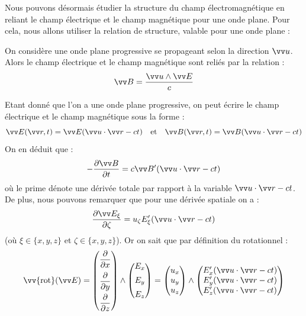 \documentclass[11pt,fleqn]{book} %
\newcommand{\rot}{\vv{\mathrm{rot}}}
\begin{document}
Nous pouvons désormais étudier la structure du champ électromagnétique en reliant le champ électrique et le champ magnétique pour une onde plane. Pour cela, nous allons utiliser la relation de structure, valable pour une onde plane :
\begin{theorem}
	On considère une onde plane progressive se propageant selon la direction $\vv u$. Alors le champ électrique et le champ magnétique sont reliés par la relation :
	\begin{equation}
		\vv B = \frac{\vv u \wedge \vv E}{c}
	\end{equation}
\end{theorem}
\begin{demonstration}
	Etant donné que l'on a une onde plane progressive, on peut écrire le champ électrique et le champ magnétique sous la forme :
	\begin{equation}
		\vv E(\vv r,t) = \vv E(\vv u \cdot \vv r - c t) \quad \mathrm{et} \quad \vv B(\vv r,t) = \vv B(\vv u \cdot \vv r - c t)
	\end{equation}
	On en déduit que :
	\begin{equation}
		- \frac{\partial \vv B}{\partial t} = c \vv B'(\vv u \cdot \vv r - c t)
	\end{equation}
	où le prime dénote une dérivée totale par rapport à la variable $\vv u \cdot \vv r - c t$. De plus, nous pouvons remarquer que pour une dérivée spatiale on a :
	\begin{equation}
		\frac{\partial \vv E_\xi}{\partial \zeta} = u_\zeta E_\xi'(\vv u \cdot \vv r - c t)
	\end{equation}
	(où $\xi \in \{x,y,z\}$ et $\zeta \in \{x,y,z\}$). Or on sait que par définition du rotationnel :
	\begin{equation}
		\rot(\vv E)  = \begin{pmatrix} \dfrac{\partial}{\partial x} \\[9pt]  \dfrac{\partial}{\partial y} \\[9pt] \dfrac{\partial}{\partial z} \end{pmatrix} \wedge \begin{pmatrix} E_x \\[5pt] E_y \\[5pt] E_z \end{pmatrix} = \begin{pmatrix} u_x \\ u_y \\ u_z \end{pmatrix} \wedge \begin{pmatrix} E_x'(\vv u \cdot \vv r - c t) \\ E_y'(\vv u \cdot \vv r - c t) \\ E_z'(\vv u \cdot \vv r - c t) \end{pmatrix}

\end{equation}
\end{demonstration}
\end{document}
